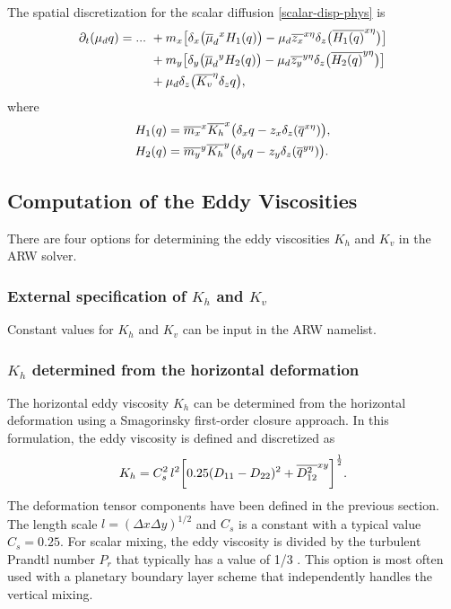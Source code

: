 \noindent
The spatial discretization for the scalar diffusion
\eqref{scalar-disp-phys} is
%
\begin{align}
\partial_t (\mu_d q) = ...\,\, & 
+ m_x \bigl[
\delta_x \bigl({\overline \mu_d}^x H_1( q) \bigr)
- \mu_d \overline{z_x}^{x\eta}\delta_z 
\bigl( {\overline{H_1( q)}}^{x\eta} \bigr)
\bigr] 
\notag \\
& + m_y \bigl[
\delta_y \bigl({\overline \mu_d}^y H_2( q) \bigr)
- \mu_d \overline{z_y}^{y\eta}\delta_z 
\bigl( {\overline{H_2( q)}}^{y\eta} \bigr)
\bigr] 
\notag \\
& + \mu_d \delta_z \bigl({\overline{K_v}}^\eta \delta_z  q \bigr),
\notag
\end{align}
%
\noindent
where
\begin{align}
H_1( q) &= \overline{m_x}^x {\overline{K_h}}^x \bigl(
\delta_x q - z_x \delta_z( {\overline{ q}}^{x\eta} )\bigr),
\notag \\
H_2( q) &= \overline{m_y}^y {\overline{K_h}}^y \bigl(
\delta_y q - z_y \delta_z( {\overline{ q}}^{y\eta} )\bigr).
\notag
\end{align}

\subsection{Computation of the Eddy Viscosities}
\label {eddy_section}

There are four options for determining the eddy viscosities $K_h$ and
$K_v$ in the ARW solver.

\subsubsection{External specification of $K_h$ and $K_v$}

Constant values for $K_h$ and $K_v$ can be input in the ARW namelist.

\subsubsection{$K_h$ determined from the horizontal deformation}

The horizontal eddy viscosity $K_h$ can be determined from the
horizontal deformation using a Smagorinsky first-order closure
approach.  In this formulation, the eddy viscosity is defined 
and discretized as
%
\begin{equation}
K_h = C_s^2 \, l^2 \biggl[ 
0.25(D_{11}-D_{22})^2 + {\overline{D_{12}^2}}^{xy}
\biggr]^{1 \over 2}.
\notag
\end{equation}
%
\noindent
The deformation tensor components have been defined in the previous
section.  The length scale $l = (\Delta x \Delta y)^{1/2}$ and $C_s$ is
a constant with a typical value $C_s = 0.25$.  For scalar mixing, the
eddy viscosity is divided by the turbulent Prandtl number $P_r$ that
typically has a value of 1/3 \citep{deardorff72}.  This option is most
often used with a planetary boundary layer scheme that independently
handles the vertical mixing.

